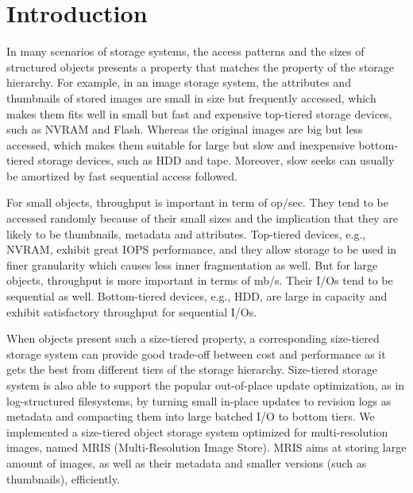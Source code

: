 \section{Introduction}
\label{intro}

In many scenarios of storage systems, the access patterns and the
sizes of structured objects presents a property that matches the
property of the storage hierarchy. For example, in an image storage
system, the attributes and thumbnails of stored images are small in
size but frequently accessed, which makes them fits well in small but
fast and expensive top-tiered storage devices, such as NVRAM and
Flash.  Whereas the original images are big but less accessed, which
makes them suitable for large but slow and inexpensive bottom-tiered
storage devices, such as HDD and tape.  Moreover, slow seeks can
usually be amortized by fast sequential access followed.

For small objects, throughput is important in term of op/sec. They
tend to be accessed randomly because of their small sizes and the
implication that they are likely to be thumbnails, metadata and
attributes.  Top-tiered devices, e.g., NVRAM, exhibit great IOPS
performance, and they allow storage to be used in finer granularity
which causes less inner fragmentation as well. But for large objects,
throughput is more important in terms of mb/s. Their I/Os tend to be
sequential as well. Bottom-tiered devices, e.g., HDD, are large in
capacity and exhibit satisfactory throughput for sequential I/Os. 

When objects present such a size-tiered property, a corresponding
size-tiered storage system can provide good trade-off between cost and
performance as it gets the best from different tiers of the storage
hierarchy. Size-tiered storage system is also able to support the
popular out-of-place update optimization, as in log-structured
filesystems, by turning small in-place updates to revision logs as
metadata and compacting them into large batched I/O to bottom tiers.
We implemented a size-tiered object storage system optimized for
multi-resolution images, named MRIS (Multi-Resolution Image Store).
MRIS aims at storing large amount of images, as well as their metadata
and smaller versions (such as thumbnails), efficiently. 


